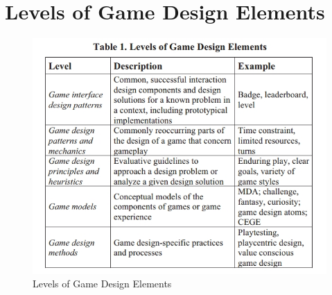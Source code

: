 \chapter{Levels of Game Design Elements}
\label{appendix:deterdinglevels}

\begin{figure}[ht]
	\centering
	\includegraphics[scale=0.45]{images/DeterdingsLevelsOfGameDesignElements.jpg}
	\caption{Levels of Game Design Elements}
\end{figure}